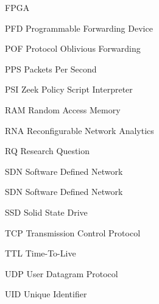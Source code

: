 \begin{listofabbrv}{FPGA}
    \item[PFD]  Programmable Forwarding Device
    \item[POF]  Protocol Oblivious Forwarding
    \item[PPS]  Packets Per Second
    \item[PSI]  Zeek Policy Script Interpreter
    \item[RAM]  Random Access Memory
    \item[RNA]  Reconfigurable Network Analytics
    \item[RQ]   Research Question
    \item[SDN]  Software Defined Network
    \item[SDN]  Software Defined Network
    \item[SSD]  Solid State Drive
    \item[TCP]  Transmission Control Protocol
    \item[TTL]  Time-To-Live
    \item[UDP]  User Datagram Protocol
    \item[UID]  Unique Identifier
\end{listofabbrv}
